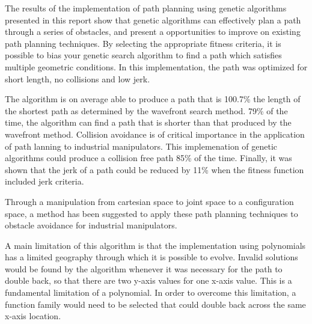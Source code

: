 The results of the implementation of path planning using genetic algorithms presented in this report show that genetic algorithms can effectively plan a path through a series of obstacles, and present a opportunities to improve on existing path planning techniques. By selecting the appropriate fitness criteria, it is possible to bias your genetic search algorithm to find a path which satisfies multiple geometric conditions. In this implementation, the path was optimized for short length, no collisions and low jerk. 

The algorithm is on average able to produce a path that is 100.7\% the length of the shortest path as determined by the wavefront search method. 79\% of the time, the algorithm can find a path that is shorter than that produced by the wavefront method. Collision avoidance is of critical importance in the application of path lanning to industrial manipulators. This implemenation of genetic algorithms could produce a collision free path 85\% of the time. Finally, it was shown that the jerk of a path could be reduced by 11\% when the fitness function included jerk criteria.

Through a manipulation from cartesian space to joint space to a configuration space, a method has been suggested to apply these path planning techniques to obstacle avoidance for industrial manipulators.

A main limitation of this algorithm is that the implementation using polynomials has a limited geography through which it is possible to evolve. Invalid solutions would be found by the algorithm whenever it was necessary for the path to double back, so that there are two y-axis values for one x-axis value. This is a fundamental limitation of a polynomial. In order to overcome this limitation, a function family would need to be selected that could double back across the same x-axis location.
